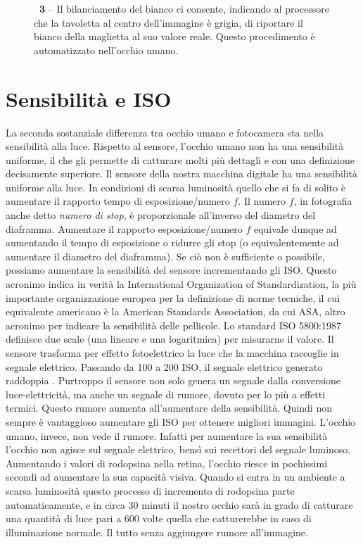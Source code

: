 \begin{figure}[!b]
\begin{center}
\caption{\textbf{\figurename~3} -- Il bilanciamento del bianco ci consente, indicando al processore che la tavoletta al centro dell'immagine è grigia, di riportare il bianco della maglietta al suo valore reale. Questo procedimento è automatizzato nell'occhio umano.}
\label{fig:bilanciamento}
\end{center}
\vskip-20pt
\end{figure}

\section*{Sensibilità e ISO}
La seconda sostanziale differenza tra occhio umano e fotocamera sta nella sensibilità alla luce. Rispetto al sensore, l'occhio umano non ha una sensibilità uniforme, il che gli permette di catturare molti più dettagli e con una definizione decisamente superiore.
Il sensore della nostra macchina digitale ha una sensibilità uniforme alla luce. In condizioni di scarsa luminosità quello che si fa di solito è aumentare il rapporto tempo di esposizione/numero $f$. Il numero $f$, in fotografia anche detto \emph{numero di stop}, è proporzionale all'inverso del diametro del diaframma. Aumentare il rapporto esposizione/numero $f$ equivale dunque ad aumentando il tempo di esposizione o ridurre gli stop (o equivalentemente ad aumentare il diametro del diaframma). Se ciò non è sufficiente o possibile, possiamo aumentare la sensibilità del sensore incrementando gli ISO. Questo acronimo indica in verità la International Organization of Standardization, la più importante organizzazione europea per la definizione di norme tecniche, il cui equivalente americano è la American Standards Association, da cui ASA, altro acronimo per indicare la sensibilità delle pellicole. Lo standard ISO 5800:1987 definisce due scale (una lineare e una logaritmica) per misurarne il valore. Il sensore trasforma per effetto fotoelettrico la luce che la macchina raccoglie in segnale elettrico. Passando da 100 a 200 ISO, il segnale elettrico generato raddoppia \cite{freeman}. Purtroppo il sensore non solo genera un segnale dalla conversione luce-elettricità, ma anche un segnale di rumore, dovuto per lo più a effetti termici. Questo rumore aumenta all'aumentare della sensibilità. Quindi non sempre è vantaggioso aumentare gli ISO per ottenere migliori immagini.
L'occhio umano, invece, non vede il rumore. Infatti per aumentare la sua sensibilità l'occhio non agisce sul segnale elettrico, bensì sui recettori del segnale luminoso. Aumentando i valori di rodopsina nella retina, l'occhio riesce in pochissimi secondi ad aumentare la sua capacità visiva. Quando si entra in un ambiente a scarsa luminosità questo processo di incremento di rodopsina parte automaticamente, e in circa 30 minuti il nostro occhio sarà in grado di catturare una quantità di luce pari a 600 volte quella che catturerebbe in caso di illuminazione normale. Il tutto senza aggiungere rumore all'immagine.
